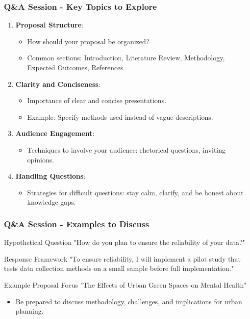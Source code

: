 \documentclass[aspectratio=169]{beamer}
\begin{document}
\begin{frame}[fragile]
    \frametitle{Q\&A Session - Key Topics to Explore}
    \begin{enumerate}
        \item \textbf{Proposal Structure}:
            \begin{itemize}
                \item How should your proposal be organized?
                \item Common sections: Introduction, Literature Review, Methodology, Expected Outcomes, References.
            \end{itemize}
        
        \item \textbf{Clarity and Conciseness}:
            \begin{itemize}
                \item Importance of clear and concise presentations.
                \item Example: Specify methods used instead of vague descriptions.
            \end{itemize}

        \item \textbf{Audience Engagement}:
            \begin{itemize}
                \item Techniques to involve your audience: rhetorical questions, inviting opinions.
            \end{itemize}

        \item \textbf{Handling Questions}:
            \begin{itemize}
                \item Strategies for difficult questions: stay calm, clarify, and be honest about knowledge gaps.
            \end{itemize}
    \end{enumerate}
\end{frame}

\begin{frame}[fragile]
    \frametitle{Q\&A Session - Examples to Discuss}
    \begin{block}{Hypothetical Question}
        "How do you plan to ensure the reliability of your data?"
    \end{block}
    \begin{block}{Response Framework}
        "To ensure reliability, I will implement a pilot study that tests data collection methods on a small sample before full implementation."
    \end{block}
    
    \begin{block}{Example Proposal Focus}
        "The Effects of Urban Green Spaces on Mental Health"
        \begin{itemize}
            \item Be prepared to discuss methodology, challenges, and implications for urban planning.
        \end{itemize}
    \end{block}
\end{frame}
\end{document}
